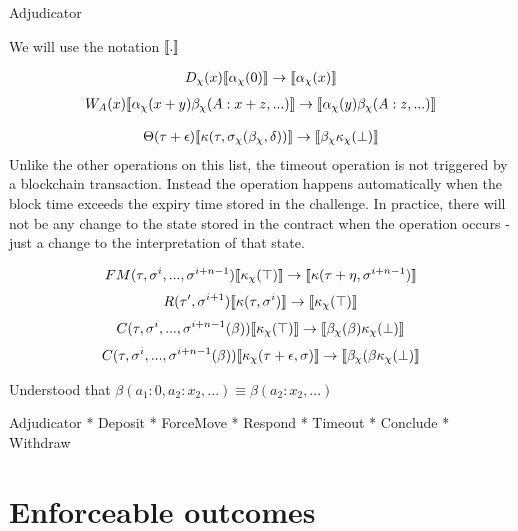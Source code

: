 Adjudicator

We will use the notation $\llbracket . \rrbracket$

\begin{align*}
D_\chi(x) \llbracket \alpha_\chi(0) \rrbracket \rightarrow \llbracket \alpha_\chi(x) \rrbracket
\end{align*}
\begin{align*}
W_A(x) \llbracket \alpha_\chi(x + y)\beta_\chi(A: x + z, ...) \rrbracket \rightarrow \llbracket \alpha_\chi(y)\beta_\chi(A: z, ...) \rrbracket
\end{align*}



\begin{align*}
\Theta(\tau + \epsilon) \llbracket \kappa(\tau, \sigma_\chi(\beta_\chi, \delta)) \rrbracket \rightarrow \llbracket \beta_\chi \kappa_\chi(\bot) \rrbracket
\end{align*}
Unlike the other operations on this list, the timeout operation is not triggered by a
blockchain transaction. Instead the operation happens automatically when the block time
exceeds the expiry time stored in the challenge. In practice, there will not be any change 
to the state stored in the contract when the operation occurs - just a change to the
interpretation of that state. 



\begin{align*}
FM(\tau, \sigma^i, ..., \sigma^{i+n-1}) \llbracket \kappa_\chi(\top) \rrbracket \rightarrow \llbracket \kappa(\tau + \eta, \sigma^{i+n-1}) \rrbracket
\end{align*}
\begin{align*}
R(\tau', \sigma^{i+1})\llbracket \kappa(\tau, \sigma^i) \rrbracket \rightarrow \llbracket \kappa_\chi(\top) \rrbracket
\end{align*}
\begin{align*}
C(\tau, \sigma^i, ..., \sigma^{i+n-1}(\beta)) \llbracket \kappa_\chi(\top) \rrbracket \rightarrow \llbracket \beta_\chi(\beta) \kappa_\chi(\bot) \rrbracket
\end{align*}
\begin{align*}
C(\tau, \sigma^i, ..., \sigma^{i+n-1}(\beta)) \llbracket \kappa_\chi(\tau + \epsilon, \sigma) \rrbracket \rightarrow \llbracket \beta_\chi(\beta \kappa_\chi(\bot) \rrbracket
\end{align*}

Understood that $\beta(a_1: 0, a_2:x_2,...) \equiv \beta(a_2:x_2, ...)$


Adjudicator
* Deposit
* ForceMove
* Respond
* Timeout
* Conclude
* Withdraw

\section{Enforceable outcomes}

